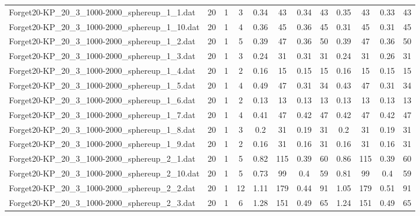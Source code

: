 \begin{sidewaystable}[!ht]
{\begin{tabular}{lccccccccccc}
Forget20-KP\_20\_3\_1000-2000\_sphereup\_1\_1.dat & 20 & 1 & 3 & 0.34 & 43 & 0.34 & 43 & 0.35 & 43 &  \textcolor{blue2}{0.33} & 43 \\
Forget20-KP\_20\_3\_1000-2000\_sphereup\_1\_10.dat & 20 & 1 & 4 & 0.36 & 45 & 0.36 & 45 &  \textcolor{blue2}{0.31} & 45 &  \textcolor{blue2}{0.31} & 45 \\
Forget20-KP\_20\_3\_1000-2000\_sphereup\_1\_2.dat & 20 & 1 & 5 & 0.39 & 47 &  \textcolor{blue2}{0.36} & 50 & 0.39 & 47 &  \textcolor{blue2}{0.36} & 50 \\
Forget20-KP\_20\_3\_1000-2000\_sphereup\_1\_3.dat & 20 & 1 & 3 &  \textcolor{blue2}{0.24} & 31 & 0.31 & 31 &  \textcolor{blue2}{0.24} & 31 & 0.26 & 31 \\
Forget20-KP\_20\_3\_1000-2000\_sphereup\_1\_4.dat & 20 & 1 & 2 & 0.16 & 15 &  \textcolor{blue2}{0.15} & 15 & 0.16 & 15 &  \textcolor{blue2}{0.15} & 15 \\
Forget20-KP\_20\_3\_1000-2000\_sphereup\_1\_5.dat & 20 & 1 & 4 & 0.49 & 47 &  \textcolor{blue2}{0.31} & 34 & 0.43 & 47 &  \textcolor{blue2}{0.31} & 34 \\
Forget20-KP\_20\_3\_1000-2000\_sphereup\_1\_6.dat & 20 & 1 & 2 &  \textcolor{blue2}{0.13} & 13 &  \textcolor{blue2}{0.13} & 13 &  \textcolor{blue2}{0.13} & 13 &  \textcolor{blue2}{0.13} & 13 \\
Forget20-KP\_20\_3\_1000-2000\_sphereup\_1\_7.dat & 20 & 1 & 4 &  \textcolor{blue2}{0.41} & 47 & 0.42 & 47 & 0.42 & 47 & 0.42 & 47 \\
Forget20-KP\_20\_3\_1000-2000\_sphereup\_1\_8.dat & 20 & 1 & 3 & 0.2 & 31 &  \textcolor{blue2}{0.19} & 31 & 0.2 & 31 &  \textcolor{blue2}{0.19} & 31 \\
Forget20-KP\_20\_3\_1000-2000\_sphereup\_1\_9.dat & 20 & 1 & 2 &  \textcolor{blue2}{0.16} & 31 &  \textcolor{blue2}{0.16} & 31 &  \textcolor{blue2}{0.16} & 31 &  \textcolor{blue2}{0.16} & 31 \\
Forget20-KP\_20\_3\_1000-2000\_sphereup\_2\_1.dat & 20 & 1 & 5 & 0.82 & 115 &  \textcolor{blue2}{0.39} & 60 & 0.86 & 115 &  \textcolor{blue2}{0.39} & 60 \\
Forget20-KP\_20\_3\_1000-2000\_sphereup\_2\_10.dat & 20 & 1 & 5 & 0.73 & 99 &  \textcolor{blue2}{0.4} & 59 & 0.81 & 99 &  \textcolor{blue2}{0.4} & 59 \\
Forget20-KP\_20\_3\_1000-2000\_sphereup\_2\_2.dat & 20 & 1 & 12 & 1.11 & 179 &  \textcolor{blue2}{0.44} & 91 & 1.05 & 179 & 0.51 & 91 \\
Forget20-KP\_20\_3\_1000-2000\_sphereup\_2\_3.dat & 20 & 1 & 6 & 1.28 & 151 &  \textcolor{blue2}{0.49} & 65 & 1.24 & 151 &  \textcolor{blue2}{0.49} & 65 \\

\end{tabular}}
\end{sidewaystable}
